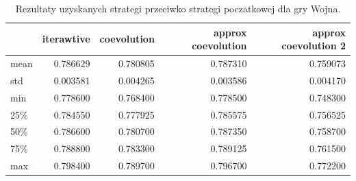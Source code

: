 \documentclass[inzynierska]{pwr_wmat_praca_dyplomowa}
\theoremstyle{plain}
\numberwithin{theorem}{chapter}
\theoremstyle{definition}
\numberwithin{theorem}{chapter}
\begin{document}
	\begin{table}[h]
		\begin{center}
			\begin{tabular}{lrrrr}
				\toprule
				{} &  iterawtive &  coevolution &  approx coevolution &  approx coevolution 2 \\
				\midrule
				mean  &    0.786629 &     0.780805 &             0.787310 &               0.759073 \\
				std   &    0.003581 &     0.004265 &             0.003586 &               0.004170 \\
				min   &    0.778600 &     0.768400 &             0.778500 &               0.748300 \\
				25\%   &    0.784550 &     0.777925 &             0.785575 &               0.756525 \\
				50\%   &    0.786600 &     0.780700 &             0.787350 &               0.758700 \\
				75\%   &    0.788800 &     0.783300 &             0.789125 &               0.761500 \\
				max   &    0.798400 &     0.789700 &             0.796700 &               0.772200 \\
				\bottomrule
			\end{tabular}
			\caption{Rezultaty uzyskanych strategi przeciwko strategi poczatkowej dla gry Wojna.}
			\label{table:rrrats_results}
		\end{center}
	\end{table}
	
\end{document}

